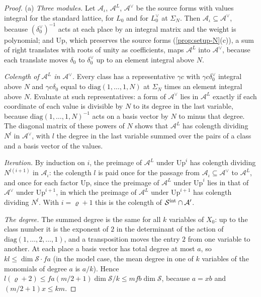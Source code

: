 \begin{proof}
(a) \emph{Three modules.} Let $\mathcal A_\iota$, $\mathcal A^L$, $\mathcal A^\vee$ be the source forms with values integral for the standard lattice, for $L_0$ and for $L_0^\vee$ at $\Sigma_N$. Then $\mathcal A_\iota\subseteq\mathcal A^\vee$, because $(\delta_0^\vee)^{-1}$ acts at each place by an integral matrix and the weight is polynomial; and
$\mathrm{Up}$, which preserves the source forms (\cref{prop:setup-N}(c)), a sum of right translates with roots of unity as coefficients, maps $\mathcal A^L$ into $\mathcal A^\vee$, because each translate moves $\delta_0$ to $\delta_0^\vee$ up to an element integral above $N$.

\emph{Colength of $\mathcal A^L$ in $\mathcal A^\vee$.} Every class has a representative $\gamma c$ with $\gamma c\delta_0^\vee$ integral above $N$ and $\gamma c\delta_0$ equal to $\mathrm{diag}(1,\dots,1,N)$ at $\Sigma_N$ times an element integral above $N$. Evaluate at such representatives: a form of $\mathcal A^\vee$ lies in $\mathcal A^L$ exactly if each coordinate of each
value is divisible by $N$ to its degree in the last variable, because $\mathrm{diag}(1,\dots,1,N)^{-1}$ acts on a basis vector by $N$ to minus that degree. The diagonal matrix of these powers of $N$ shows that $\mathcal A^L$ has colength dividing $N^l$ in $\mathcal A^\vee$, with $l$ the degree in the last variable summed over the pairs of a class and a basis
vector of the values.

\emph{Iteration.} By induction on $i$, the preimage of $\mathcal A^L$ under $\mathrm{Up}^i$ has colength dividing $N^{l(i+1)}$ in $\mathcal A_\iota$: the colength $l$ is paid once for the passage from $\mathcal A_\iota\subseteq\mathcal A^\vee$ to $\mathcal A^L$, and once for each factor $\mathrm{Up}$, since the preimage of $\mathcal A^L$ under $\mathrm{Up}^i$ lies in that of
$\mathcal A^\vee$ under $\mathrm{Up}^{i+1}$, in which the preimage of $\mathcal A^L$ under $\mathrm{Up}^{i+1}$ has colength dividing $N^l$. With $i=\varrho+1$ this is the colength of $\mathcal S^{\rm int}\cap\mathcal A'$.

\emph{The degree.} The summed degree is the same for all $k$ variables of $X_0$: up to the class number it is the exponent of $2$ in the determinant of the action of $\mathrm{diag}(1,\dots,2,\dots,1)$, and a transposition moves the entry $2$ from one variable to another. At each place a basis vector has total degree at most $a$, so $kl\le\dim\mathcal S\cdot fa$
(in the model case, the mean degree in one of $k$ variables of the monomials of degree $a$ is $a/k$). Hence $l(\varrho+2)\le fa(m/2+1)\dim\mathcal S/k\le mfb\dim\mathcal S$, because $a=xb$ and $(m/2+1)x\le km$.


\end{proof}
